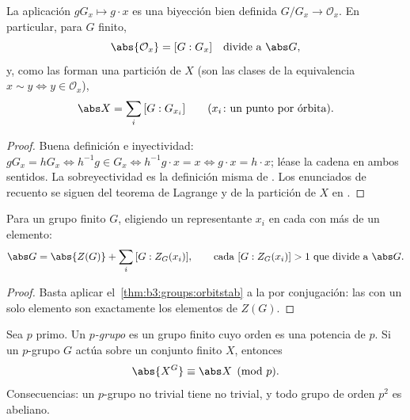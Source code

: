 \begin{theorem}\label{thm:b3:groups:orbitstab}
La aplicación $gG_x \mapsto g \cdot x$ es una biyección bien definida
$G/G_x \to \mathcal O_x$. En particular, para $G$ finito,
\[
\abs{\mathcal O_x} = [G : G_x] \quad\text{divide a } \abs G,
\]
y, como las  forman una partición
de $X$ (son las clases de la equivalencia
$x \sim y \iff y \in \mathcal O_x$),
\[
\abs X = \sum_{i} \,[G : G_{x_i}]
\qquad (x_i\colon \text{un punto por órbita}).
\]
\end{theorem}

\begin{proof}
Buena definición e inyectividad: $gG_x = hG_x \iff h^{-1}g \in G_x \iff
h^{-1}g \cdot x = x \iff g \cdot x = h \cdot x$; léase la cadena en
ambos sentidos. La sobreyectividad es la definición misma de
. Los enunciados de recuento se
siguen del teorema de Lagrange y de la partición de $X$ en
.
\end{proof}

\begin{corollary}\label{cor:b3:groups:classeq}
Para un grupo finito $G$, eligiendo un representante $x_i$ en cada
 con más de un
elemento:
\[
\abs G = \abs{Z(G)} + \sum_i \,[G : Z_G(x_i)],
\qquad\text{cada } [G : Z_G(x_i)] > 1 \text{ que divide a } \abs G.
\]
\end{corollary}

\begin{proof}
Basta aplicar el~\cref{thm:b3:groups:orbitstab} a la
 por conjugación: las
 con un solo elemento son
exactamente los elementos de $Z(G)$.
\end{proof}

\begin{theorem}\label{thm:b3:groups:pfixed}
Sea $p$ primo. Un \emph{$p$-grupo} es un grupo
finito cuyo orden es una potencia de $p$. Si un $p$-grupo $G$ actúa
sobre un conjunto finito $X$, entonces
\[
\abs{X^G} \equiv \abs X \pmod p .
\]
Consecuencias: un $p$-grupo no trivial tiene
 no trivial, y todo grupo de orden
$p^2$ es abeliano.
\end{theorem}

